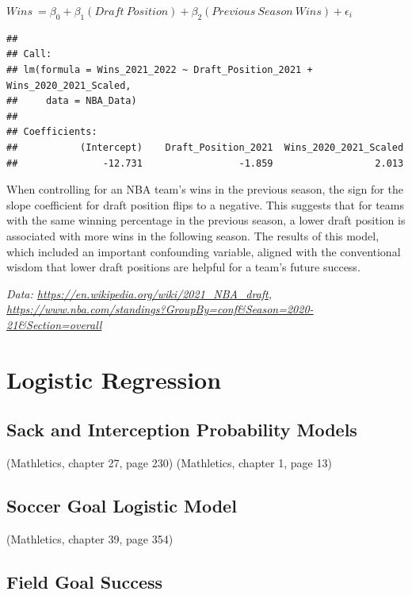 \documentclass[
  11pt,
]{book}
\theoremstyle{definition}
\theoremstyle{definition}
\theoremstyle{definition}
\theoremstyle{definition}
\theoremstyle{remark}
\begin{document}
\(Wins\ = \beta_0 + \beta_1(Draft\ Position) + \beta_2(Previous\ Season\ Wins) + \epsilon_i\)

\begin{verbatim}
## 
## Call:
## lm(formula = Wins_2021_2022 ~ Draft_Position_2021 + Wins_2020_2021_Scaled, 
##     data = NBA_Data)
## 
## Coefficients:
##           (Intercept)    Draft_Position_2021  Wins_2020_2021_Scaled  
##               -12.731                 -1.859                  2.013
\end{verbatim}

When controlling for an NBA team's wins in the previous season, the sign for the slope coefficient for draft position flips to a negative. This suggests that for teams with the same winning percentage in the previous season, a lower draft position is associated with more wins in the following season. The results of this model, which included an important confounding variable, aligned with the conventional wisdom that lower draft positions are helpful for a team's future success.

\emph{Data: \url{https://en.wikipedia.org/wiki/2021_NBA_draft}, \url{https://www.nba.com/standings?GroupBy=conf\&Season=2020-21\&Section=overall}}

\hypertarget{logistic-regression}{%
\section{Logistic Regression}\label{logistic-regression}}

\hypertarget{sack-and-interception-probability-models}{%
\subsection{Sack and Interception Probability Models}\label{sack-and-interception-probability-models}}

(Mathletics, chapter 27, page 230)
(Mathletics, chapter 1, page 13)

\hypertarget{soccer-goal-logistic-model}{%
\subsection{Soccer Goal Logistic Model}\label{soccer-goal-logistic-model}}

(Mathletics, chapter 39, page 354)

\hypertarget{field-goal-success}{%
\subsection{Field Goal Success}\label{field-goal-success}}
\end{document}
